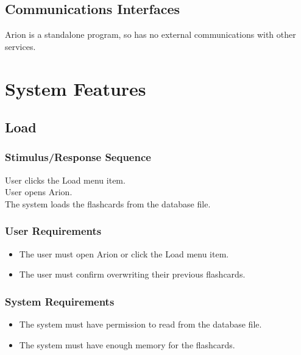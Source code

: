 \documentclass{scrreprt}
\begin{document}
\section{Communications Interfaces}
Arion is a standalone program, so has no external communications with other services.


\chapter{System Features}

\section{Load}
    \subsection*{Stimulus/Response Sequence}
        \begin{flushleft}
             User clicks the Load menu item. \\
             User opens Arion. \\
             The system loads the flashcards from the database file. \\
        \end{flushleft}

    \subsection*{User Requirements}
        \begin{itemize}
            \item The user must open Arion or click the Load menu item.
            \item The user must confirm overwriting their previous flashcards.
        \end{itemize}

    \subsection*{System Requirements}
        \begin{itemize}
            \item The system must have permission to read from the database file.
            \item The system must have enough memory for the flashcards.
        \end{itemize}
\end{document}

